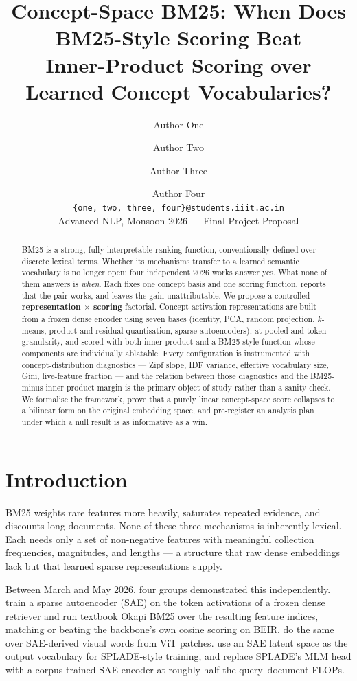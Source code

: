 \documentclass[11pt]{article}
\title{Concept-Space BM25: When Does BM25-Style Scoring Beat\\
Inner-Product Scoring over Learned Concept Vocabularies?}
\author{
  Author One \and Author Two \and Author Three \and Author Four \\
  \texttt{\{one, two, three, four\}@students.iiit.ac.in} \\
  Advanced NLP, Monsoon 2026 --- Final Project Proposal
}
\begin{document}
\maketitle

\begin{abstract}
BM25 is a strong, fully interpretable ranking function, conventionally defined over discrete lexical terms. Whether its mechanisms transfer to a learned semantic vocabulary is no longer open: four independent 2026 works answer yes. What none of them answers is \emph{when}. Each fixes one concept basis and one scoring function, reports that the pair works, and leaves the gain unattributable. We propose a controlled \textbf{representation $\times$ scoring} factorial. Concept-activation representations are built from a frozen dense encoder using seven bases (identity, PCA, random projection, $k$-means, product and residual quantisation, sparse autoencoders), at pooled and token granularity, and scored with both inner product and a BM25-style function whose components are individually ablatable. Every configuration is instrumented with concept-distribution diagnostics --- Zipf slope, IDF variance, effective vocabulary size, Gini, live-feature fraction --- and the relation between those diagnostics and the BM25-minus-inner-product margin is the primary object of study rather than a sanity check. We formalise the framework, prove that a purely linear concept-space score collapses to a bilinear form on the original embedding space, and pre-register an analysis plan under which a null result is as informative as a win.
\end{abstract}

\section{Introduction}

BM25 weights rare features more heavily, saturates repeated evidence, and discounts long documents. None of these three mechanisms is inherently lexical. Each needs only a set of non-negative features with meaningful collection frequencies, magnitudes, and lengths --- a structure that raw dense embeddings lack but that learned sparse representations supply.

Between March and May 2026, four groups demonstrated this independently. \citet{clavie2026latent} train a sparse autoencoder (SAE) on the token activations of a frozen dense retriever and run textbook Okapi BM25 over the resulting feature indices, matching or beating the backbone's own cosine scoring on BEIR. \citet{han2026bm25v} do the same over SAE-derived visual words from ViT patches. \citet{formal2026splare} use an SAE latent space as the output vocabulary for SPLADE-style training, and \citet{zong2026tokens} replace SPLADE's MLM head with a corpus-trained SAE encoder at roughly half the query--document FLOPs.
\end{document}
